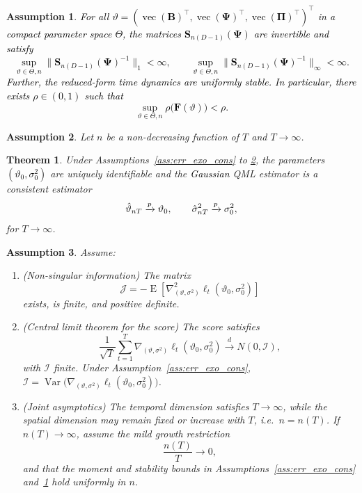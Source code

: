 \documentclass[10pt,a4paper]{amsart}
\newtheorem{assumption}{Assumption}
\newtheorem{theorem}{Theorem}
\DeclareMathOperator{\E}{E}
\DeclareMathOperator{\Var}{Var}
\DeclareMathOperator{\vop}{vec}
\newcommand{\xmat}{\mathbf}
\begin{document}
\begin{assumption}\label{ass:stability_cons}
\textcolor{black}{
For all $\vartheta=(\vop(\xmat{B})^\top,\vop(\xmat{\Psi})^\top,\vop(\xmat{\Pi})^\top)^\top$ in a compact parameter space $\Theta$,
the matrices $\xmat{S}_{n(D-1)}(\xmat{\Psi})$ are invertible and satisfy
\[
\sup_{\vartheta\in\Theta,n}\|\xmat{S}_{n(D-1)}(\xmat{\Psi})^{-1}\|_1<\infty,
\qquad
\sup_{\vartheta\in\Theta,n}\|\xmat{S}_{n(D-1)}(\xmat{\Psi})^{-1}\|_\infty<\infty .
\]
%
Further, the reduced-form time dynamics are uniformly stable. In particular,
there exists $\rho\in(0,1)$ such that
\[
\sup_{\vartheta\in\Theta,n}
\rho\!\big(\xmat{F}(\vartheta)\big)<\rho .
\]}
\end{assumption}

 \begin{assumption}\label{ass:asymptotics_cons}
	Let $n$ be a non-decreasing function of $T$ and $T \to \infty$.
\end{assumption}

\begin{theorem}\label{th:consistency}
Under Assumptions~\ref{ass:err_exo_cons} to \ref{ass:asymptotics_cons}, the parameters \textcolor{black}{$(\vartheta_0,\sigma_0^2)$} are uniquely identifiable and the \textcolor{black}{Gaussian} QML estimator is a consistent estimator
\[
\hat\vartheta_{nT}\xrightarrow{p}\vartheta_0,\qquad
\textcolor{black}{\hat\sigma^2_{nT}\xrightarrow{p}\sigma_0^2,}
\]
for $T \to \infty$.
\end{theorem}

\begin{assumption}\label{ass:AN_reg}
Assume:
%
\begin{enumerate}
\item[(i)] (\emph{Non-singular information})
The matrix
\[
\mathcal{J}
=
-\E\!\left[\nabla^2_{(\vartheta,\sigma^2)}\ell_t(\vartheta_0,\sigma_0^2)\right]
\]
exists, is finite, and positive definite.
%
\item[(ii)] (\emph{Central limit theorem for the score})
The score satisfies
\[
\frac{1}{\sqrt{T}}\sum_{t=1}^T
\nabla_{(\vartheta,\sigma^2)}\ell_t(\vartheta_0,\sigma_0^2)
\xrightarrow{d} N(0,\mathcal{I}),
\]
with $\mathcal{I}$ finite.
Under Assumption~\ref{ass:err_exo_cons},
$\mathcal{I}=\Var\!\big(\nabla_{(\vartheta,\sigma^2)}\ell_t(\vartheta_0,\sigma_0^2)\big)$.
%
\item[(iii)] (\emph{Joint asymptotics})
The temporal dimension satisfies $T\to\infty$, while the spatial
dimension may remain fixed or increase with $T$, i.e.\ $n=n(T)$.
If $n(T)\to\infty$, assume the mild growth restriction
\[
\frac{n(T)}{T}\to0,
\]
and that the moment and stability bounds in
Assumptions~\ref{ass:err_exo_cons} and~\ref{ass:stability_cons}
hold uniformly in $n$.
\end{enumerate}
\end{assumption}
\end{document}
